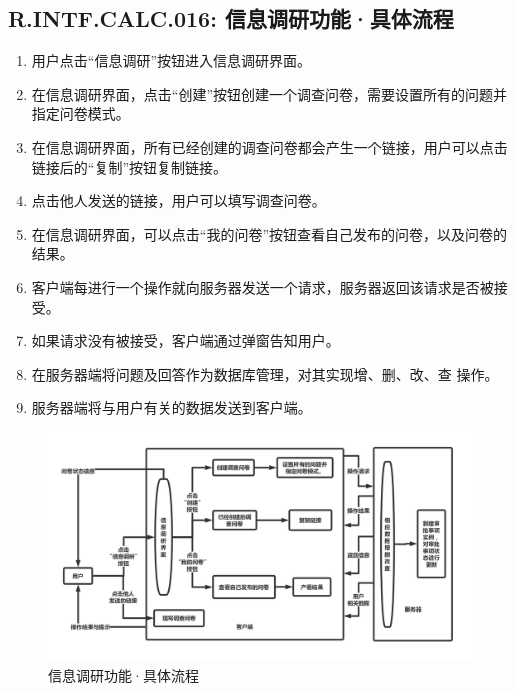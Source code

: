         {
        \color{red}
        \subsection{\color{red}R.INTF.CALC.016: 信息调研功能·具体流程}
            \begin{enumerate}
                \item 用户点击“信息调研”按钮进入信息调研界面。
                \item 在信息调研界面，点击“创建”按钮创建一个调查问卷，需要设置所有的问题并指定问卷模式。
                \item 在信息调研界面，所有已经创建的调查问卷都会产生一个链接，用户可以点击链接后的“复制”按钮复制链接。
                \item 点击他人发送的链接，用户可以填写调查问卷。
                \item 在信息调研界面，可以点击“我的问卷”按钮查看自己发布的问卷，以及问卷的结果。
                \item 客户端每进行一个操作就向服务器发送一个请求，服务器返回该请求是否被接受。
                \item 如果请求没有被接受，客户端通过弹窗告知用户。
                \item 在服务器端将问题及回答作为数据库管理，对其实现增、删、改、查 操作。
                \item 服务器端将与用户有关的数据发送到客户端。
            \end{enumerate}
        }
        \begin{figure}[h]
            \centering
            \includegraphics[scale=0.35]{OutlineDesign/figures/信息调研功能·具体流程.png}
            \caption{\color{red}信息调研功能·具体流程}
            \label{fig:server_flow}
        \end{figure}
